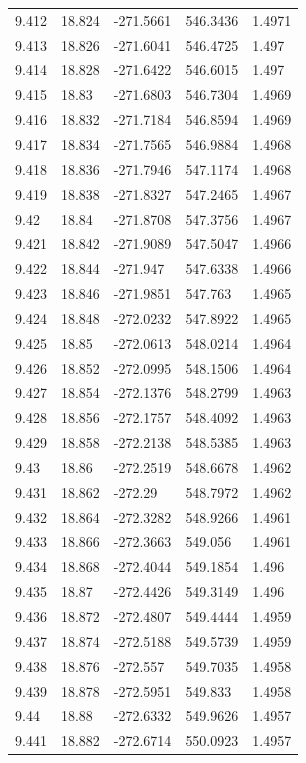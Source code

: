 \begin{tabular}{lllll}
9.412 & 18.824 & -271.5661 & 546.3436 & 1.4971 \\
9.413 & 18.826 & -271.6041 & 546.4725 & 1.497 \\
9.414 & 18.828 & -271.6422 & 546.6015 & 1.497 \\
9.415 & 18.83 & -271.6803 & 546.7304 & 1.4969 \\
9.416 & 18.832 & -271.7184 & 546.8594 & 1.4969 \\
9.417 & 18.834 & -271.7565 & 546.9884 & 1.4968 \\
9.418 & 18.836 & -271.7946 & 547.1174 & 1.4968 \\
9.419 & 18.838 & -271.8327 & 547.2465 & 1.4967 \\
9.42 & 18.84 & -271.8708 & 547.3756 & 1.4967 \\
9.421 & 18.842 & -271.9089 & 547.5047 & 1.4966 \\
9.422 & 18.844 & -271.947 & 547.6338 & 1.4966 \\
9.423 & 18.846 & -271.9851 & 547.763 & 1.4965 \\
9.424 & 18.848 & -272.0232 & 547.8922 & 1.4965 \\
9.425 & 18.85 & -272.0613 & 548.0214 & 1.4964 \\
9.426 & 18.852 & -272.0995 & 548.1506 & 1.4964 \\
9.427 & 18.854 & -272.1376 & 548.2799 & 1.4963 \\
9.428 & 18.856 & -272.1757 & 548.4092 & 1.4963 \\
9.429 & 18.858 & -272.2138 & 548.5385 & 1.4963 \\
9.43 & 18.86 & -272.2519 & 548.6678 & 1.4962 \\
9.431 & 18.862 & -272.29 & 548.7972 & 1.4962 \\
9.432 & 18.864 & -272.3282 & 548.9266 & 1.4961 \\
9.433 & 18.866 & -272.3663 & 549.056 & 1.4961 \\
9.434 & 18.868 & -272.4044 & 549.1854 & 1.496 \\
9.435 & 18.87 & -272.4426 & 549.3149 & 1.496 \\
9.436 & 18.872 & -272.4807 & 549.4444 & 1.4959 \\
9.437 & 18.874 & -272.5188 & 549.5739 & 1.4959 \\
9.438 & 18.876 & -272.557 & 549.7035 & 1.4958 \\
9.439 & 18.878 & -272.5951 & 549.833 & 1.4958 \\
9.44 & 18.88 & -272.6332 & 549.9626 & 1.4957 \\
9.441 & 18.882 & -272.6714 & 550.0923 & 1.4957 \\

\end{tabular}
